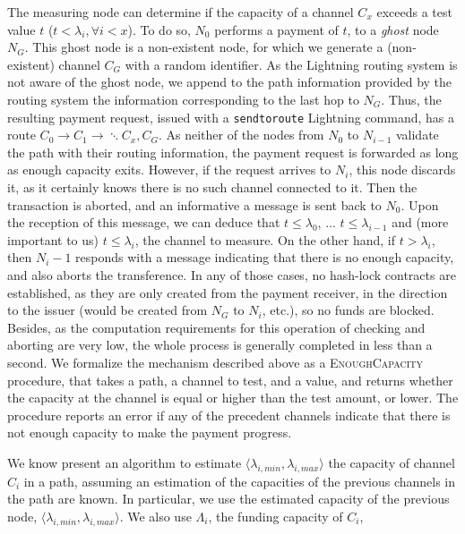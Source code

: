 The measuring node can determine if the capacity of a channel $C_{x}$ exceeds a test value $t$ ($t<\lambda_i, \forall i < x$). 
To do so, $N_0$ performs a payment of $t$, to a \textit{ghost} node $N_G$.
This ghost node is a non-existent node, for which we generate a (non-existent) channel $C_{G}$ with a random identifier.
As the Lightning routing system is not aware of the ghost node, we 
 append to the path information provided by the routing system the information corresponding to the last hop to $N_G$.
Thus, the resulting payment request, issued with a \texttt{sendtoroute} Lightning command, has a route $C_{0} \rightarrow C_1 \rightarrow \ddots C_x, C_{G}$. 
As neither of the nodes from $N_0$ to $N_{i-1}$ validate the path with their routing information, the payment request is forwarded as long as enough capacity exits. 
However, if the request arrives to $N_i$, this node discards it, as it certainly knows there is no such channel connected to it. 
Then the transaction is aborted, and an informative a message is sent back to $N_0$.
Upon the reception of this message, we can deduce that $t \leq \lambda_{0}$, ... $t \leq \lambda_{i-1}$ and (more important to us) $t \leq \lambda_{i}$, the channel to measure.
On the other hand, if $t > \lambda_{i}$, then $N_i-1$ responds with a message indicating that there is no enough capacity, and also aborts the transference. 
In any of those cases, no hash-lock contracts are established, as they are only created from the payment receiver, in the direction to the issuer (would be created from $N_G$ to $N_i$, etc.), so no funds are blocked. 
Besides, as the computation requirements for this operation of checking and aborting are very low, the whole process is generally completed in less than a second.
We formalize the mechanism described above as a \textsc{EnoughCapacity} procedure, that takes a path, a channel to test, and a value, and returns whether the capacity at the channel is equal or higher than the test amount, or lower. 
The procedure reports an error if any of the precedent channels indicate that there is not enough capacity to make the payment progress.

We know present an algorithm to estimate $\langle \lambda_{i,min}, \lambda_{i,max} \rangle$ the capacity of channel $C_i$ in a path, assuming an estimation of the capacities of the previous channels in the path are known. 
In particular, we use the estimated capacity of the previous node, $\langle \lambda_{i,min}, \lambda_{i,max} \rangle$.
We also use $\Lambda_{i}$, the funding capacity of $C_{i}$, 

